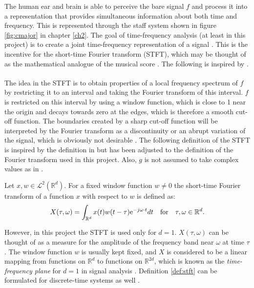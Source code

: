 The human ear and brain is able to perceive the bare signal $f$ and process it into a representation that provides simultaneous information about both time and frequency. This is represented through the staff system shown in figure \ref{fig:cmajor} in chapter \ref{ch2}. The goal of time-frequency analysis (at least in this project) is to create a joint time-frequency representation of a signal \cite{page 22, FTFA}. This is the incentive for the short-time Fourier transform (STFT), which may be thought of as the mathematical analogue of the musical score \cite{page 37, FTFA}. The following is inspired by \cite{page 37, FTFA}.
\\ \\
The idea in the STFT is to obtain properties of a local frequency spectrum of $f$ by restricting it to an interval and taking the Fourier transform of this interval. $f$ is restricted on this interval by using a window function, which is close to 1 near the origin and decays towards zero at the edges, which is therefore a smooth cut-off function. The boundaries created by a sharp cut-off function will be interpreted by the Fourier transform as a discontinuity or an abrupt variation of the signal, which is obviously not desirable \cite{Davis}. The following definition of the STFT is inspired by the definition in \cite{page 37, FTFA} but has been adjusted to the definition of the Fourier transform used in this project. Also, $g$ is not assumed to take complex values as in \cite{page 37, FTFA}.

\begin{definition}\label{def:stft}
Let $x,w \in \mathcal{L}^2(\mathbb{R}^d)$. For a fixed window function $w \neq 0$ the short-time Fourier transform of a function $x$ with respect to $w$ is defined as:
\begin{align}
X(\tau,\omega) = \int_{\mathbb{R}^d} x(t) w(t - \tau) \text{e}^{-j \omega \cdot t} dt \quad \textnormal{for} \quad \tau,\omega \in \mathbb{R}^d.
\end{align}
\end{definition}

However, in this project the STFT is used only for $d = 1$. $X(\tau,\omega)$ can be thought of as a measure for the amplitude of the frequency band near $\omega$ at time $\tau$. The window function $w$ is usually kept fixed, and $X$ is considered to be a linear mapping from functions on $\mathbb{R}^d$ to functions on $\mathbb{R}^{2d}$, which is known as the \textit{time-frequency plane} for $d=1$ in signal analysis \cite{page 38, FTFA}. Definition \ref{def:stft} can be formulated for discrete-time systems as well \cite{page 846, DTSP}.

